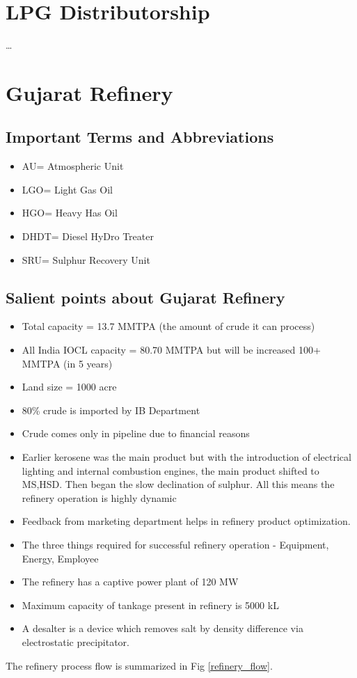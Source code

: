 \documentclass{report}
\begin{document}
	\chapter{LPG Distributorship}
	\ldots
	\chapter{Gujarat Refinery}
	\section{Important Terms and Abbreviations}
	\begin{itemize}
		\item AU= Atmospheric Unit
		\item LGO= Light Gas Oil
		\item HGO= Heavy Has Oil
		\item DHDT= Diesel HyDro Treater
		\item SRU= Sulphur Recovery Unit
	\end{itemize}
	\section{Salient points about Gujarat Refinery}
	\begin{itemize}
		\item Total capacity = 13.7 MMTPA (the amount of crude it can process)
		\item All India IOCL capacity = 80.70 MMTPA but will be increased 100+ MMTPA (in 5 years)
		\item Land size = 1000 acre
		\item 80\% crude is imported by IB Department
		\item Crude comes only in pipeline due to financial reasons
		\item Earlier kerosene was the main product but with the introduction of electrical lighting and internal combustion engines, the main product shifted to MS,HSD. Then began the slow declination of sulphur. All this means the refinery operation is highly dynamic
		\item Feedback from marketing department helps in refinery product optimization.
		\item The three things required for successful refinery operation - Equipment, Energy, Employee
		\item The refinery has a captive power plant of 120 MW
		\item Maximum capacity of tankage present in refinery is 5000 kL
		\item A desalter is a device which removes salt by density difference via electrostatic precipitator.
	\end{itemize}
	The refinery process flow is summarized in Fig \ref{refinery_flow}.
\end{document}
